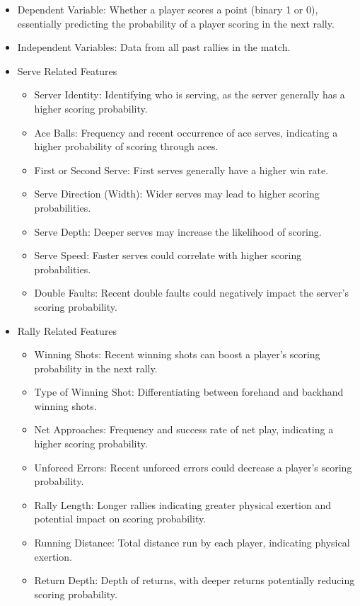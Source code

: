 \documentclass[11pt,a4paper]{article}
\begin{document}
	\begin{itemize}
		\item Dependent Variable: Whether a player scores a point (binary 1 or 0), essentially predicting the probability of a player scoring in the next rally.
		\item Independent Variables: Data from all past rallies in the match.
		\item Serve Related Features
		\begin{itemize}
			\item Server Identity: Identifying who is serving, as the server generally has a higher scoring probability.
			\item Ace Balls: Frequency and recent occurrence of ace serves, indicating a higher probability of scoring through aces.
			\item First or Second Serve: First serves generally have a higher win rate.
			\item Serve Direction (Width): Wider serves may lead to higher scoring probabilities.
			\item Serve Depth: Deeper serves may increase the likelihood of scoring.
			\item Serve Speed: Faster serves could correlate with higher scoring probabilities.
			\item Double Faults: Recent double faults could negatively impact the server's scoring probability.
		\end{itemize}
		\item Rally Related Features
		\begin{itemize}
			\item Winning Shots: Recent winning shots can boost a player's scoring probability in the next rally.
			\item Type of Winning Shot: Differentiating between forehand and backhand winning shots.
			\item Net Approaches: Frequency and success rate of net play, indicating a higher scoring probability.
			\item Unforced Errors: Recent unforced errors could decrease a player's scoring probability.
			\item Rally Length: Longer rallies indicating greater physical exertion and potential impact on scoring probability.
			\item Running Distance: Total distance run by each player, indicating physical exertion.
			\item Return Depth: Depth of returns, with deeper returns potentially reducing scoring probability.

\end{itemize}
\end{itemize}
\end{document}
